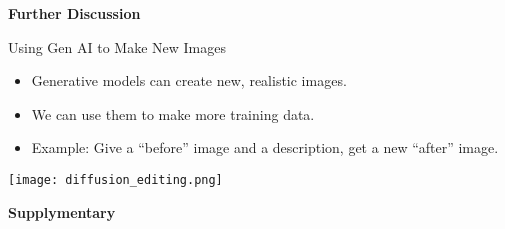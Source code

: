\begin{refsection}
  \begin{frame}
    \centering
    \vspace{2.5cm}
    {\LARGE \textbf{Further Discussion}}
  \end{frame}
\end{refsection}

 
\begin{refsection}
  \begin{frame}{Using Gen AI to Make New Images}
    \begin{itemize}
      \item Generative models can create new, realistic images.
      \item We can use them to make more training data.
      \item Example: Give a “before” image and a description, get a new “after” image.
    \end{itemize}
    \centering
    \texttt{[image: diffusion\_editing.png]}
  \end{frame}
  \end{refsection}

  
\begin{refsection}
  \begin{frame}
    \centering
    \vspace{2.5cm}
    {\LARGE \textbf{Supplymentary}}
  \end{frame}
\end{refsection}

